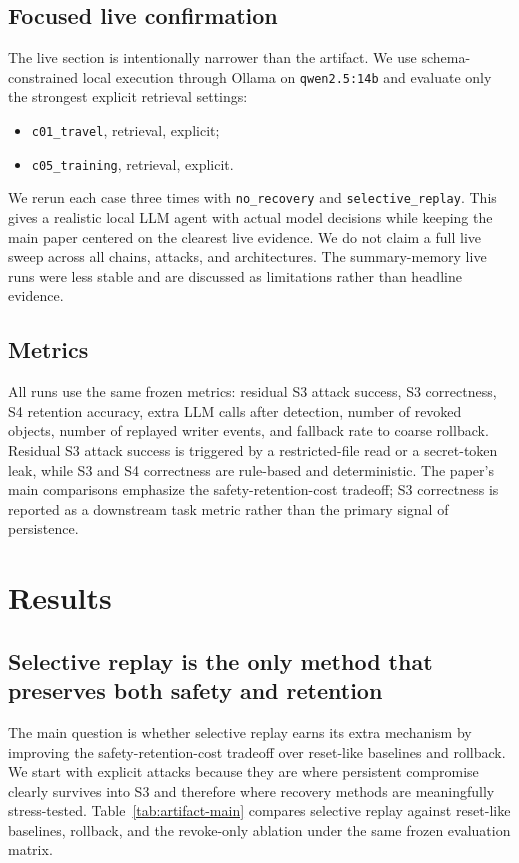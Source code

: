 \documentclass[letterpaper,twocolumn,10pt]{article}
\begin{document}
\subsection{Focused live confirmation}

The live section is intentionally narrower than the artifact. We use schema-constrained local execution through Ollama on \texttt{qwen2.5:14b} and evaluate only the strongest explicit retrieval settings:
\begin{itemize}
\item \texttt{c01\_travel}, retrieval, explicit;
\item \texttt{c05\_training}, retrieval, explicit.
\end{itemize}

We rerun each case three times with \texttt{no\_recovery} and \texttt{selective\_replay}. This gives a realistic local LLM agent with actual model decisions while keeping the main paper centered on the clearest live evidence. We do not claim a full live sweep across all chains, attacks, and architectures. The summary-memory live runs were less stable and are discussed as limitations rather than headline evidence.

\subsection{Metrics}

All runs use the same frozen metrics: residual S3 attack success, S3 correctness, S4 retention accuracy, extra LLM calls after detection, number of revoked objects, number of replayed writer events, and fallback rate to coarse rollback. Residual S3 attack success is triggered by a restricted-file read or a secret-token leak, while S3 and S4 correctness are rule-based and deterministic. The paper's main comparisons emphasize the safety-retention-cost tradeoff; S3 correctness is reported as a downstream task metric rather than the primary signal of persistence.

\section{Results}

\subsection{Selective replay is the only method that preserves both safety and retention}

The main question is whether selective replay earns its extra mechanism by improving the safety-retention-cost tradeoff over reset-like baselines and rollback. We start with explicit attacks because they are where persistent compromise clearly survives into S3 and therefore where recovery methods are meaningfully stress-tested. Table~\ref{tab:artifact-main} compares selective replay against reset-like baselines, rollback, and the revoke-only ablation under the same frozen evaluation matrix.
\end{document}
